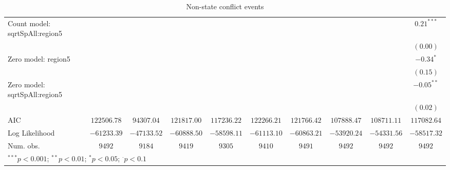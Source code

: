 \begin{sidewaystable}
\begin{center}
{\begin{tabular}{l c c c c c c c c c}
Count model: sqrtSpAll:region5 &               &               &               &                 &               &               &               &                & $0.21^{***}$  \\
                               &               &               &               &                 &               &               &               &                & $(0.00)$      \\
Zero model: region5            &               &               &               &                 &               &               &               &                & $-0.34^{*}$   \\
                               &               &               &               &                 &               &               &               &                & $(0.15)$      \\
Zero model: sqrtSpAll:region5  &               &               &               &                 &               &               &               &                & $-0.05^{**}$  \\
                               &               &               &               &                 &               &               &               &                & $(0.02)$      \\
\midrule
AIC                            & $122506.78$   & $94307.04$    & $121817.00$   & $117236.22$     & $122266.21$   & $121766.42$   & $107888.47$   & $108711.11$    & $117082.64$   \\
Log Likelihood                 & $-61233.39$   & $-47133.52$   & $-60888.50$   & $-58598.11$     & $-61113.10$   & $-60863.21$   & $-53920.24$   & $-54331.56$    & $-58517.32$   \\
Num. obs.                      & $9492$        & $9184$        & $9419$        & $9305$          & $9410$        & $9491$        & $9492$        & $9492$         & $9492$        \\
\bottomrule
\multicolumn{10}{l}{\scriptsize{$^{***}p<0.001$; $^{**}p<0.01$; $^{*}p<0.05$; $^{\cdot}p<0.1$}}
\end{tabular}
}
\caption{Non-state conflict events}
\label{znon_state}
\end{center}
\end{sidewaystable}
